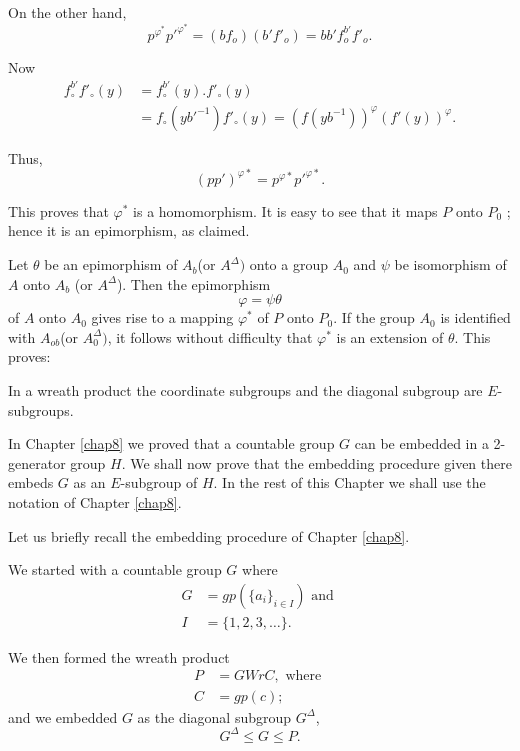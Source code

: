  On the other hand, 
 $$
 p^{\varphi^*} p'^{\varphi^*}= (bf_o) (b' f'_o) =bb' f^{b'}_o f'_o. 
 $$

Now\pageoriginale 
\begin{align*}
  f^{b'}_\circ f'_\circ (y) &= f^{b'}_\circ (y).  f'_\circ(y)\\
   & = f_\circ (yb'^{-1}) f'_\circ(y) = (f(yb^{-1}))^{\varphi} (f' (y))^{\varphi}.
\end{align*}

Thus,
$$
(pp')^{\varphi *} = p^{\varphi *} p'^{\varphi *}.
$$

This proves that $\varphi^*$ is a homomorphism. It is easy to see that
it maps $P$ onto $P_0$ ; hence it is an epimorphism, as claimed. 

Let $\theta$ be an epimorphism of $A_b$(or $A^{\Delta})$ onto a group
$A_0$ and $\psi$ be isomorphism of $A$ onto $A_b$ (or
$A^{\Delta}$). Then the epimorphism  
$$
\varphi = \psi \theta
$$
of $A$ onto $A_0$ gives rise to a mapping $\varphi^*$ of $P$ onto
$P_0$. If the group $A_0$ is identified with $A_{ob}$(or
$A^{\Delta}_0)$, it follows without difficulty that $\varphi^*$ is an
extension of $\theta$. This proves: 
\setcounter{Lemma}{0}
\begin{Lemma}\label{chap12:sec3:lem1}%
  In a wreath product the coordinate subgroups and the diagonal
  subgroup are $E$-subgroups. 
\end{Lemma}

In Chapter \ref{chap8} we proved that a countable group $G$ can be embedded in
a 2-generator group $H$. We shall now prove that the embedding\pageoriginale
procedure given there embeds $G$ as an $E$-subgroup of $H$. In the rest
of this Chapter we shall use the notation of Chapter \ref{chap8}. 

Let us briefly recall the embedding procedure of Chapter \ref{chap8}. 

We started with a  countable group $G$ where 
\begin{align*}
  G & = gp(\big\{ a_i \big\}_{i \in  I}) \text{ and }\\
  I & = \big\{ 1,2,3, \ldots \big\}.
\end{align*}

We then formed the wreath product 
\begin{align*}
  P& = GW r C, \text{ where }\\
  C& = gp(c) ;
\end{align*}
and we embedded $G$ as the diagonal subgroup $G^{\Delta}$,
$$
G^{\Delta} \leq G \leq P.
$$

